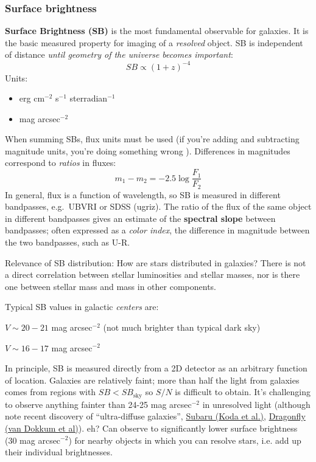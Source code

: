 \documentclass{article}
\newcommand{\mynotes}[1]{\textcolor{cadmiumgreen}{#1}}
\begin{document}
\subsubsection{Surface brightness}
\textbf{Surface Brightness (SB)} is the most fundamental observable for
galaxies. It is the basic measured property for imaging of a \emph{resolved}
object. SB is independent of distance \emph{until geometry of the universe
becomes important}:
\[
    SB \propto (1+z)^{-4}
    \]
Units:
\begin{itemize}
    \item erg cm$^{-2}$ s$^{-1}$ sterradian$^{-1}$
    \item mag arcsec$^{-2}$
\end{itemize}
When summing SBs, flux units must be used (if you're adding and
subtracting magnitude units, you're doing something wrong \Smiley).
Differences in magnitudes correspond to \emph{ratios} in fluxes:
\[
    m_{1} - m_{2} = -2.5\log\frac{F_{1}}{F_{2}}
    \]
In general, flux is a function of wavelength, so SB is measured in different
bandpasses, e.g.\ UBVRI or SDSS (ugriz). The ratio of the flux of the same
object in different bandpasses gives an estimate of the \textbf{spectral slope}
between bandpasses; often expressed as a \emph{color index}, the difference in
magnitude between the two bandpasses, such as U-R.

Relevance of SB distribution: How are stars distributed in galaxies? There is
not a direct correlation between stellar luminosities and stellar masses, nor
is there one between stellar mass and mass in other components.

Typical SB values in galactic \emph{centers} are:
\begin{description}[align=right,labelwidth=5em]
    \item [Spiral] $V \sim 20 - 21$ mag arcsec$^{-2}$
        (not much brighter than typical dark sky)
    \item [Elliptical] $V \sim 16 - 17$ mag arcsec$^{-2}$
\end{description}
In principle, SB is measured directly from a 2D detector as an arbitrary
function of location. Galaxies are relatively faint; more than half the light
from galaxies comes from regions with $SB < SB_{\mathrm{sky}}$ so $S/N$ is
difficult to obtain. It's challenging to observe anything fainter than 24-25
mag arcsec$^{-2}$ in unresolved light
(although note recent discovery of ``ultra-diffuse galaxies'', \href{https://arxiv.org/abs/1506.01712}
{Subaru (Koda et al.)}, \href{http://arxiv.org/abs/1410.8141}
{Dragonfly (van Dokkum et al)}). \mynotes{eh?}
Can observe to significantly lower surface
brightness (30 mag arcsec$^{-2}$) for nearby objects in which you can resolve
stars, i.e. add up their individual brightnesses.
\end{document}
